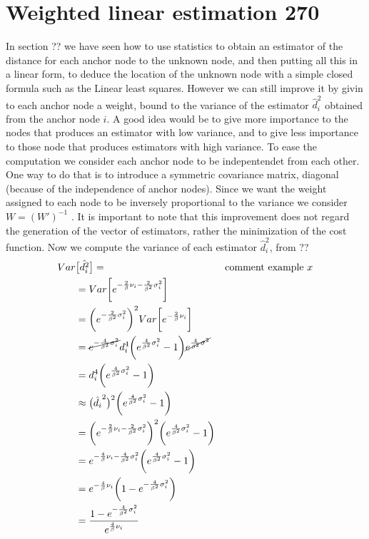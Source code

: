 \documentclass[12pt,twoside]{report}
\begin{document}
\section{Weighted linear estimation 270}
In section ?? we have seen how to use statistics to obtain an estimator of the distance for each anchor node to the unknown node, and then putting all this in a linear form, to deduce the location of the unknown node with a simple closed formula such as the Linear least squares. However we can still improve it by givin to each anchor node a weight, bound to the variance of the estimator $\hat{d}_i^2$ obtained from the anchor node $i$. A good idea would be to give more importance to the nodes that produces an estimator with low variance, and to give less importance to those node that produces estimators with high variance. To ease the computation we consider each anchor node to be indepentendet from each other. One way to do that is to introduce a symmetric covariance matrix, diagonal (because of the independence of anchor nodes). Since we want the weight assigned to each node to be inversely proportional to the variance we consider $W=(W')^{-1}$ \cite{rzk,899498y4hd}. It is important to note that this improvement does not regard the generation of the vector of estimators, rather the minimization of the cost function. Now we compute the variance of each estimator $\hat{d}_i^2$, from ??
\begin{align}
Var&\big[\hat{d_i^2}\big]=&& \text{comment example } x\\
&=Var\bigg[e^{-\frac{2}{\beta}\nu_i-\frac{2}{\beta^2}\sigma^2_i}\bigg]\\
&=\bigg(e^{-\frac{2}{\beta^2}\sigma^2_i}\bigg)^2Var\bigg[e^{-\frac{2}{\beta}\nu_i}\bigg]\\
&=\cancel{e^{-\frac{4}{\beta^2}\sigma^2_i}}d_i^4\bigg(e^{\frac{4}{\beta^2}\sigma_i^2}-1\bigg)\cancel{e^{\frac{4}{\beta^2}\sigma^2}}\\
&=d_i^4\bigg(e^{\frac{4}{\beta^2}\sigma_i^2}-1\bigg)\\
&\approx \big(\hat{d_i}^2\big)^2\bigg(e^{\frac{4}{\beta^2}\sigma_i^2}-1\bigg)\\
&=\bigg(e^{-\frac{2}{\beta}\nu_i-\frac{2}{\beta^2}\sigma^2_i}\bigg)^2\bigg(e^{\frac{4}{\beta^2}\sigma_i^2}-1\bigg)\\
&=e^{-\frac{4}{\beta}\nu_i-\frac{4}{\beta^2}\sigma^2_i}\bigg(e^{\frac{4}{\beta^2}\sigma^2_i}-1\bigg)\\
&=e^{-\frac{4}{\beta}\nu_i}\bigg(1-e^{-\frac{4}{\beta^2}\sigma^2_i}\bigg)\\
&=\frac{1-e^{-\frac{4}{\beta^2}\sigma^2_i}}{e^{\frac{4}{\beta}\nu_i}}
\end{align}
\end{document}
